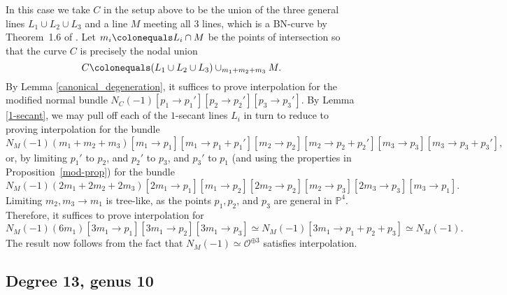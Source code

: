 \documentclass[11pt]{amsart}
\newcommand{\pp}{\mathbb{P}}
\renewcommand{\O}{\mathcal{O}}
\newtheorem{lem}[thm]{Lemma}
\theoremstyle{definition}
\theoremstyle{remark}
\begin{document}
In this case we take $C$ in the setup above to be the union of the three general lines $L_1 \cup L_2 \cup L_3$ and a line $M$ meeting all $3$ lines, which is a BN-curve by Theorem~1.6 of \cite{rbn}.  Let $m_i \colonequals L_i \cap M$ be the points of intersection so that the curve $C$ is precisely the nodal union
\[C\colonequals (L_1 \cup L_2 \cup L_3) \cup_{m_1 + m_2 + m_3} M.\]  
By Lemma \ref{canonical_degeneration}, it suffices to prove interpolation for the modified normal bundle $N_C(-1)[p_1 \to p_1'][p_2\to p_2'][p_3 \to p_3']$. 
By Lemma \ref{1-secant}, we may pull off each of the $1$-secant lines $L_i$ in turn to reduce to proving interpolation for the bundle
\[N_M(-1)(m_1+m_2+m_3)[m_1 \to p_1][m_1 \to p_1+p_1'][m_2 \to p_2][m_2 \to p_2+p_2'][m_3 \to p_3][m_3 \to p_3+p_3'],\]
or, by limiting $p_1'$ to $p_2$, and $p_2'$ to $p_3$, and $p_3'$ to $p_1$
(and using the properties in Proposition~\ref{mod-prop})
for the bundle
\[N_M(-1)(2m_1+2m_2+2m_3)[2m_1\to p_1][m_1 \to p_2][2m_2\to p_2][m_2 \to p_3][2m_3 \to p_3][m_3\to p_1].\]
Limiting $m_2, m_3 \to m_1$ is tree-like, as the points $p_1, p_2$, and $p_3$ are general in $\pp^4$.  Therefore, it suffices to prove interpolation for
\[N_M(-1)(6m_1)[3m_1 \to p_1][3m_1 \to p_2][3m_1\to p_3] \simeq N_M(-1)[3m_1 \to p_1 + p_2 + p_3] \simeq N_M(-1).\]
The result now follows from the fact that $N_M(-1) \simeq \O^{\oplus 3}$
satisfies interpolation.


\subsection{Degree 13, genus 10}\label{13_10}
\end{document}
